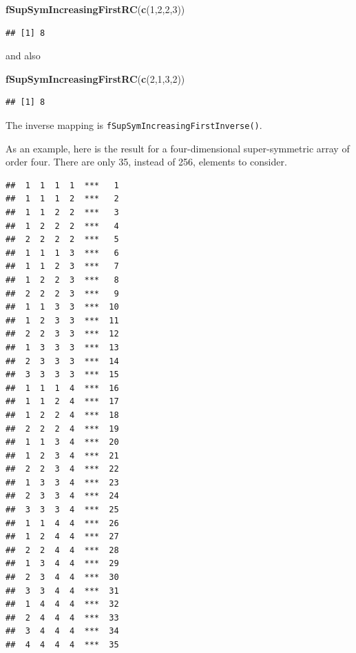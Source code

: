 \documentclass[12pt,]{article}
\newenvironment{Shaded}{\begin{snugshade}}{\end{snugshade}}
\newcommand{\KeywordTok}[1]{\textcolor[rgb]{0.13,0.29,0.53}{\textbf{#1}}}
\newcommand{\DecValTok}[1]{\textcolor[rgb]{0.00,0.00,0.81}{#1}}
\newcommand{\NormalTok}[1]{#1}
\begin{document}
\begin{Shaded}
\begin{Highlighting}[]
\KeywordTok{fSupSymIncreasingFirstRC}\NormalTok{(}\KeywordTok{c}\NormalTok{(}\DecValTok{1}\NormalTok{,}\DecValTok{2}\NormalTok{,}\DecValTok{2}\NormalTok{,}\DecValTok{3}\NormalTok{))}
\end{Highlighting}
\end{Shaded}

\begin{verbatim}
## [1] 8
\end{verbatim}

and also

\begin{Shaded}
\begin{Highlighting}[]
\KeywordTok{fSupSymIncreasingFirstRC}\NormalTok{(}\KeywordTok{c}\NormalTok{(}\DecValTok{2}\NormalTok{,}\DecValTok{1}\NormalTok{,}\DecValTok{3}\NormalTok{,}\DecValTok{2}\NormalTok{))}
\end{Highlighting}
\end{Shaded}

\begin{verbatim}
## [1] 8
\end{verbatim}

The inverse mapping is \texttt{fSupSymIncreasingFirstInverse()}.

As an example, here is the result for a four-dimensional super-symmetric
array of order four. There are only 35, instead of 256, elements to
consider.

\begin{verbatim}
##  1  1  1  1  ***   1 
##  1  1  1  2  ***   2 
##  1  1  2  2  ***   3 
##  1  2  2  2  ***   4 
##  2  2  2  2  ***   5 
##  1  1  1  3  ***   6 
##  1  1  2  3  ***   7 
##  1  2  2  3  ***   8 
##  2  2  2  3  ***   9 
##  1  1  3  3  ***  10 
##  1  2  3  3  ***  11 
##  2  2  3  3  ***  12 
##  1  3  3  3  ***  13 
##  2  3  3  3  ***  14 
##  3  3  3  3  ***  15 
##  1  1  1  4  ***  16 
##  1  1  2  4  ***  17 
##  1  2  2  4  ***  18 
##  2  2  2  4  ***  19 
##  1  1  3  4  ***  20 
##  1  2  3  4  ***  21 
##  2  2  3  4  ***  22 
##  1  3  3  4  ***  23 
##  2  3  3  4  ***  24 
##  3  3  3  4  ***  25 
##  1  1  4  4  ***  26 
##  1  2  4  4  ***  27 
##  2  2  4  4  ***  28 
##  1  3  4  4  ***  29 
##  2  3  4  4  ***  30 
##  3  3  4  4  ***  31 
##  1  4  4  4  ***  32 
##  2  4  4  4  ***  33 
##  3  4  4  4  ***  34 
##  4  4  4  4  ***  35
\end{verbatim}
\end{document}
